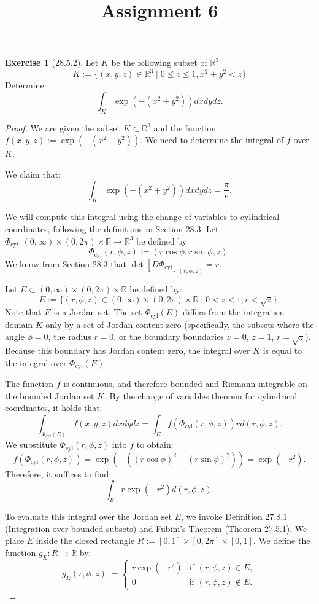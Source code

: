 \documentclass[11pt,a4paper]{article}
\theoremstyle{definition}
\newtheorem{exercise}{Exercise}
\theoremstyle{plain}
\theoremstyle{remark}
\begin{document}
\title{Assignment 6}
\date{}
\maketitle

\begin{exercise}[28.5.2]
Let $K$ be the following subset of $\mathbb{R}^3$
\[ K := \{ (x,y,z) \in \mathbb{R}^3 \mid 0 \le z \le 1, x^2 + y^2 < z \} \]
Determine
\[ \int_K \exp(-(x^2 + y^2)) dxdydz. \]
\end{exercise}

\begin{proof}
We are given the subset $K \subset \mathbb{R}^3$ and the function $f(x,y,z) := \exp(-(x^2 + y^2))$. We need to determine the integral of $f$ over $K$.

We claim that:
\[ \int_K \exp(-(x^2 + y^2)) dxdydz = \frac{\pi}{e}. \]

We will compute this integral using the change of variables to cylindrical coordinates, following the definitions in Section 28.3. 
Let $\Phi_{\text{cyl}} : (0, \infty) \times (0, 2\pi) \times \mathbb{R} \to \mathbb{R}^3$ be defined by
\[ \Phi_{\text{cyl}}(r, \phi, z) := (r \cos \phi, r \sin \phi, z). \]
We know from Section 28.3 that $\det [D\Phi_{\text{cyl}}]_{(r,\phi,z)} = r$.

Let $E \subset (0, \infty) \times (0, 2\pi) \times \mathbb{R}$ be defined by:
\[ E := \{ (r, \phi, z) \in (0, \infty) \times (0, 2\pi) \times \mathbb{R} \mid 0 < z < 1, r < \sqrt{z} \}. \]
Note that $E$ is a Jordan set. The set $\Phi_{\text{cyl}}(E)$ differs from the integration domain $K$ only by a set of Jordan content zero (specifically, the subsets where the angle $\phi=0$, the radius $r=0$, or the boundary boundaries $z=0$, $z=1$, $r=\sqrt{z}$). Because this boundary has Jordan content zero, the integral over $K$ is equal to the integral over $\Phi_{\text{cyl}}(E)$.

The function $f$ is continuous, and therefore bounded and Riemann integrable on the bounded Jordan set $K$. By the change of variables theorem for cylindrical coordinates, it holds that:
\[ \int_{\Phi_{\text{cyl}}(E)} f(x,y,z) dxdydz = \int_E f(\Phi_{\text{cyl}}(r, \phi, z)) r d(r,\phi,z). \]
We substitute $\Phi_{\text{cyl}}(r, \phi, z)$ into $f$ to obtain:
\[ f(\Phi_{\text{cyl}}(r, \phi, z)) = \exp(-((r \cos \phi)^2 + (r \sin \phi)^2)) = \exp(-r^2). \]
Therefore, it suffices to find:
\[ \int_E r \exp(-r^2) d(r,\phi,z). \]

To evaluate this integral over the Jordan set $E$, we invoke Definition 27.8.1 (Integration over bounded subsets) and Fubini's Theorem (Theorem 27.5.1). We place $E$ inside the closed rectangle $R := [0, 1] \times [0, 2\pi] \times [0, 1]$. We define the function $g_E : R \to \mathbb{R}$ by:
\[ g_E(r, \phi, z) := \begin{cases} 
r \exp(-r^2) & \text{if } (r, \phi, z) \in E, \\ 
0 & \text{if } (r, \phi, z) \notin E.
\end{cases} \]


\end{proof}
\end{document}
